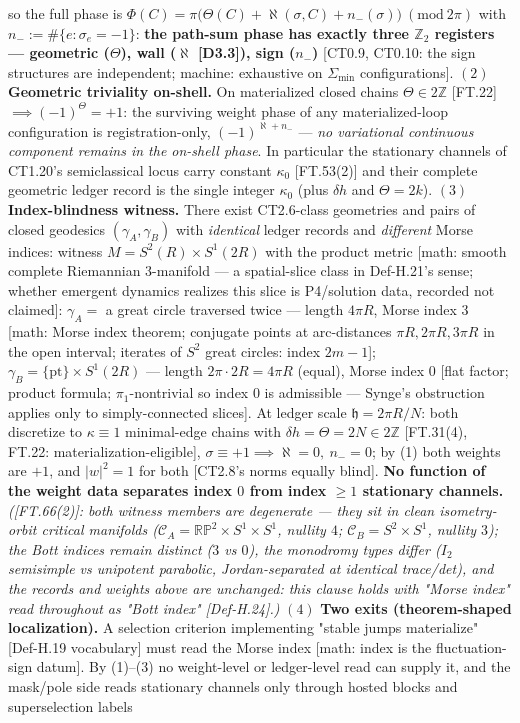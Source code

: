 \begin{theorem}
so the full phase is $\Phi(C)=\pi\bigl(\Theta(C)+\aleph(\sigma,C)+n_-(\sigma)\bigr)\ (\mathrm{mod}\ 2\pi)$ with $n_-:=\#\{e:\sigma_e=-1\}$: \textbf{the path-sum phase has exactly three $\mathbb Z_2$ registers — geometric ($\Theta$), wall ($\aleph$ [D3.3]), sign ($n_-$)} [CT0.9, CT0.10: the sign structures are independent; machine: exhaustive on $\Sigma_{\min}$ configurations]. $(2)$ \textbf{Geometric triviality on-shell.} On materialized closed chains $\Theta\in2\mathbb Z$ [FT.22] $\implies(-1)^{\Theta}=+1$: the surviving weight phase of any materialized-loop configuration is registration-only, $(-1)^{\aleph+n_-}$ — \textit{no variational continuous component remains in the on-shell phase}. In particular the stationary channels of CT1.20's semiclassical locus carry constant $\kappa_0$ [FT.53(2)] and their complete geometric ledger record is the single integer $\kappa_0$ (plus $\delta h$ and $\Theta=2k$). $(3)$ \textbf{Index-blindness witness.} There exist CT2.6-class geometries and pairs of closed geodesics $(\gamma_A,\gamma_B)$ with \textit{identical} ledger records and \textit{different} Morse indices: witness $M=S^2(R)\times S^1(2R)$ with the product metric [math: smooth complete Riemannian 3-manifold — a spatial-slice class in Def-H.21's sense; whether emergent dynamics realizes this slice is P4/solution data, recorded not claimed]: $\gamma_A=$ a great circle traversed twice — length $4\pi R$, Morse index $3$ [math: Morse index theorem; conjugate points at arc-distances $\pi R,2\pi R,3\pi R$ in the open interval; iterates of $S^2$ great circles: index $2m-1$]; $\gamma_B=\{\mathrm{pt}\}\times S^1(2R)$ — length $2\pi\cdot2R=4\pi R$ (equal), Morse index $0$ [flat factor; product formula; $\pi_1$-nontrivial so index $0$ is admissible — Synge's obstruction applies only to simply-connected slices]. At ledger scale $\mathfrak h=2\pi R/N$: both discretize to $\kappa\equiv1$ minimal-edge chains with $\delta h=\Theta=2N\in2\mathbb Z$ [FT.31(4), FT.22: materialization-eligible], $\sigma\equiv+1\implies\aleph=0,\ n_-=0$; by (1) both weights are $+1$, and $|w|^2=1$ for both [CT2.8's norms equally blind]. \textbf{No function of the weight data separates index $0$ from index $\ge1$ stationary channels.} \textit{([FT.66(2)]: both witness members are degenerate — they sit in clean isometry-orbit critical manifolds ($\mathcal C_A=\mathbb{RP}^2\times S^1\times S^1$, nullity $4$; $\mathcal C_B=S^2\times S^1$, nullity $3$); the Bott indices remain distinct ($3$ vs $0$), the monodromy types differ ($I_2$ semisimple vs unipotent parabolic, Jordan-separated at identical trace/det), and the records and weights above are unchanged: this clause holds with "Morse index" read throughout as "Bott index" [Def-H.24].)} $(4)$ \textbf{Two exits (theorem-shaped localization).} A selection criterion implementing "stable jumps materialize" [Def-H.19 vocabulary] must read the Morse index [math: index is the fluctuation-sign datum]. By (1)–(3) no weight-level or ledger-level read can supply it, and the mask/pole side reads stationary channels only through hosted blocks and superselection labels 
\end{theorem}
